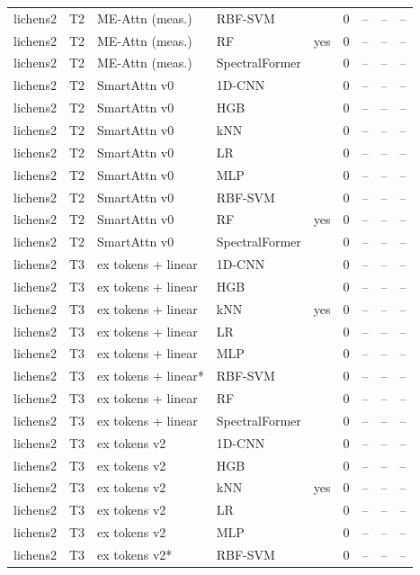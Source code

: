 \begin{tabular}{lllllcccc}
lichens2 & T2 & ME-Attn (meas.) & RBF-SVM &  & 0 & -- & -- & -- \\
lichens2 & T2 & ME-Attn (meas.) & RF & yes & 0 & -- & -- & -- \\
lichens2 & T2 & ME-Attn (meas.) & SpectralFormer &  & 0 & -- & -- & -- \\
lichens2 & T2 & SmartAttn v0 & 1D-CNN &  & 0 & -- & -- & -- \\
lichens2 & T2 & SmartAttn v0 & HGB &  & 0 & -- & -- & -- \\
lichens2 & T2 & SmartAttn v0 & kNN &  & 0 & -- & -- & -- \\
lichens2 & T2 & SmartAttn v0 & LR &  & 0 & -- & -- & -- \\
lichens2 & T2 & SmartAttn v0 & MLP &  & 0 & -- & -- & -- \\
lichens2 & T2 & SmartAttn v0 & RBF-SVM &  & 0 & -- & -- & -- \\
lichens2 & T2 & SmartAttn v0 & RF & yes & 0 & -- & -- & -- \\
lichens2 & T2 & SmartAttn v0 & SpectralFormer &  & 0 & -- & -- & -- \\
lichens2 & T3 & ex tokens + linear & 1D-CNN &  & 0 & -- & -- & -- \\
lichens2 & T3 & ex tokens + linear & HGB &  & 0 & -- & -- & -- \\
lichens2 & T3 & ex tokens + linear & kNN & yes & 0 & -- & -- & -- \\
lichens2 & T3 & ex tokens + linear & LR &  & 0 & -- & -- & -- \\
lichens2 & T3 & ex tokens + linear & MLP &  & 0 & -- & -- & -- \\
lichens2 & T3 & ex tokens + linear* & RBF-SVM &  & 0 & -- & -- & -- \\
lichens2 & T3 & ex tokens + linear & RF &  & 0 & -- & -- & -- \\
lichens2 & T3 & ex tokens + linear & SpectralFormer &  & 0 & -- & -- & -- \\
lichens2 & T3 & ex tokens v2 & 1D-CNN &  & 0 & -- & -- & -- \\
lichens2 & T3 & ex tokens v2 & HGB &  & 0 & -- & -- & -- \\
lichens2 & T3 & ex tokens v2 & kNN & yes & 0 & -- & -- & -- \\
lichens2 & T3 & ex tokens v2 & LR &  & 0 & -- & -- & -- \\
lichens2 & T3 & ex tokens v2 & MLP &  & 0 & -- & -- & -- \\
lichens2 & T3 & ex tokens v2* & RBF-SVM &  & 0 & -- & -- & -- \\

\end{tabular}
